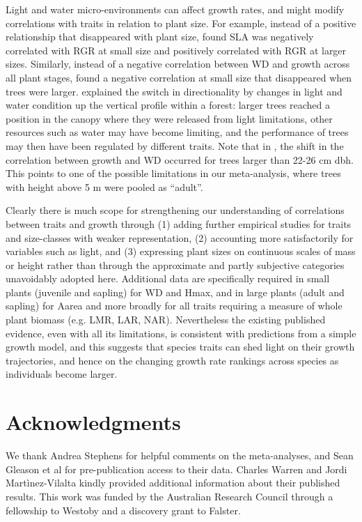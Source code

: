\documentclass[a4paper,11pt]{article}
\begin{document}
Light and water micro-environments can affect growth rates, and might modify correlations with traits in relation to plant size. For example, instead of a positive relationship that disappeared with plant size, \citet{Iida:2014ep} found SLA was negatively correlated with RGR at small size and positively correlated with RGR at larger sizes. Similarly, instead of a negative correlation between WD and growth across all plant stages, \citep{Iida:2014ep,Iida:2014hq} found a negative correlation at small size that disappeared when trees were larger. \citet{Iida:2014hq} explained the switch in directionality by changes in light and water condition up the vertical profile within a forest: larger trees reached a position in the canopy where they were released from light limitations, other resources such as water may have become limiting, and the performance of trees may then have been regulated by different traits. Note that in \citet{Iida:2014hq}, the shift in the correlation between growth and WD occurred for trees larger than 22-26 cm dbh. This points to one of the possible limitations in our meta-analysis, where trees with height above 5 m were pooled as ``adult''.

Clearly there is much scope for strengthening our understanding of correlations between traits and growth through (1) adding further empirical studies for traits and size-classes with weaker representation, (2) accounting more satisfactorily for variables such as light, and (3) expressing plant sizes on continuous scales of mass or height rather than through the approximate and partly subjective categories unavoidably adopted here. Additional data are specifically required in small plants (juvenile and sapling) for WD and Hmax, and in large plants (adult and sapling) for Aarea and more broadly for all traits requiring a measure of whole plant biomass (e.g. LMR, LAR, NAR). Nevertheless the existing published evidence, even with all its limitations, is consistent with predictions from a simple growth model, and this suggests that species traits can shed light on their growth trajectories, and hence on the changing growth rate rankings across species as individuals become larger.

\section*{Acknowledgments}\label{Acknowledgment}

We thank Andrea Stephens for helpful comments on the meta-analyses, and Sean Gleason et al for pre-publication access to their data. Charles Warren and Jordi Martìnez-Vilalta kindly provided additional information about their published results. This work was funded by the Australian Research Council through a fellowship to Westoby and a discovery grant to Falster.
\end{document}
